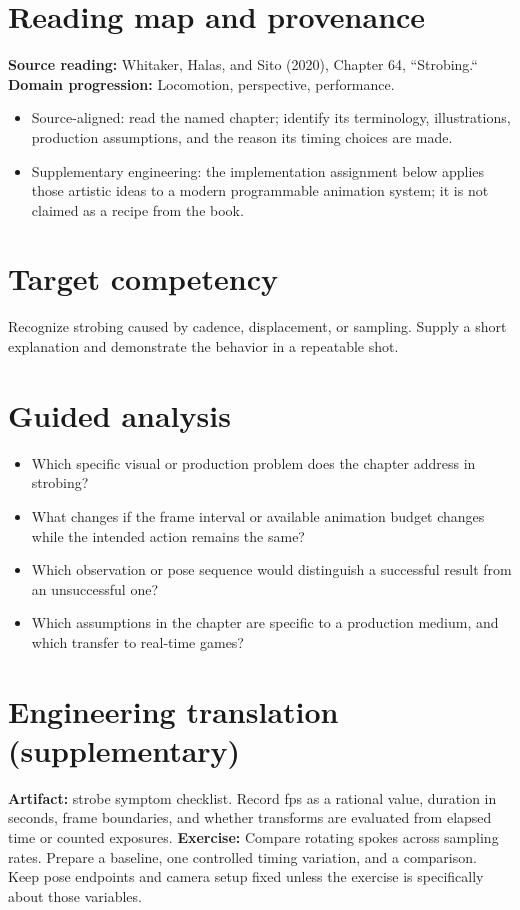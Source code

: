 \documentclass[10pt,letterpaper]{article}
\begin{document}
\makedoctitle
\makedocsummary

\section{Reading map and provenance}
\textbf{Source reading:} Whitaker, Halas, and Sito (2020), Chapter 64, ``Strobing.``\\
\textbf{Domain progression:} Locomotion, perspective, performance.
\begin{itemize}
\item Source-aligned: read the named chapter; identify its terminology, illustrations, production assumptions, and the reason its timing choices are made.
\item Supplementary engineering: the implementation assignment below applies those artistic ideas to a modern programmable animation system; it is not claimed as a recipe from the book.
\end{itemize}
\section{Target competency}
Recognize strobing caused by cadence, displacement, or sampling. Supply a short explanation and demonstrate the behavior in a repeatable shot.
\section{Guided analysis}
\begin{itemize}
\item Which specific visual or production problem does the chapter address in strobing?
\item What changes if the frame interval or available animation budget changes while the intended action remains the same?
\item Which observation or pose sequence would distinguish a successful result from an unsuccessful one?
\item Which assumptions in the chapter are specific to a production medium, and which transfer to real-time games?
\end{itemize}
\section{Engineering translation (supplementary)}
\textbf{Artifact:} strobe symptom checklist. Record fps as a rational value, duration in seconds, frame boundaries, and whether transforms are evaluated from elapsed time or counted exposures.
\textbf{Exercise:} Compare rotating spokes across sampling rates. Prepare a baseline, one controlled timing variation, and a comparison. Keep pose endpoints and camera setup fixed unless the exercise is specifically about those variables.
\end{document}
